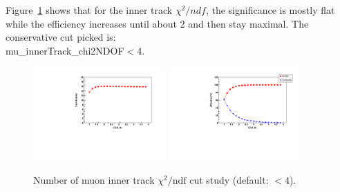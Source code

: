 Figure~\ref{fig:mu_innerTrack_chi2NDOF} shows that for the inner track $\chi^2/ndf$, the significance is mostly flat while the efficiency increases 
until about 2 and then stay maximal. The conservative cut picked is: \\ mu\_innerTrack\_chi2NDOF$<$4.
%
\begin{figure}[h!]
 \begin{center}
   \includegraphics[angle=0,width=0.45\textwidth]{chap_YInPbPbColl2011_figures/InChi2_Significance1} 
   \includegraphics[angle=0,width=0.45\textwidth]{chap_YInPbPbColl2011_figures/InChi2_SigBkgRejEff}
   \caption{Number of muon inner track $\chi^2/\text{ndf}$ cut study  (default: $<4$).} %
   \label{fig:mu_innerTrack_chi2NDOF}
 \end{center}
\end{figure}

